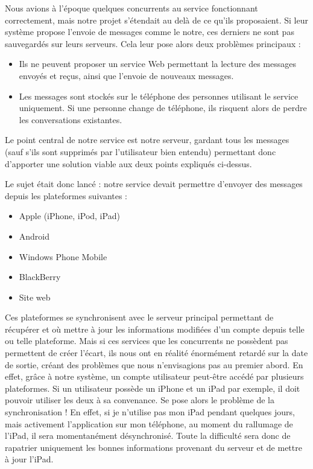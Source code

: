 \documentclass{article}
\begin{document}
	Nous avions à l’époque quelques concurrents au service fonctionnant correctement, mais notre projet s’étendait au delà de ce qu’ils proposaient. Si leur système propose l’envoie de messages comme le notre, ces derniers ne sont pas sauvegardés sur leurs serveurs. Cela leur pose alors deux problèmes principaux :
\begin{itemize}
\item Ils ne peuvent proposer un service Web permettant la lecture des messages envoyés et reçus, ainsi que l’envoie de nouveaux messages.
\item Les messages sont stockés sur le téléphone des personnes utilisant le service uniquement. Si une personne change de téléphone, ils risquent alors de perdre les conversations existantes.
\end{itemize}

Le point central de notre service est notre serveur, gardant tous les messages (sauf s’ils sont supprimés par l’utilisateur bien entendu) permettant donc d’apporter une solution viable aux deux points expliqués ci-dessus.
	
Le sujet était donc lancé : notre service devait permettre d’envoyer des messages depuis les plateformes suivantes :
\begin{itemize}
\item Apple (iPhone, iPod, iPad)
\item Android
\item Windows Phone Mobile
\item BlackBerry
\item Site web
\end{itemize}

Ces plateformes se synchronisent avec le serveur principal permettant de récupérer et où mettre à jour les informations modifiées d’un compte depuis telle ou telle plateforme. Mais si ces services que les concurrents ne possèdent pas permettent de créer l’écart, ils nous ont en réalité énormément retardé sur la date de sortie, créant des problèmes que nous n’envisagions pas au premier abord. En effet, grâce à notre système, un compte utilisateur peut-être accédé par plusieurs plateformes. Si un utilisateur possède un iPhone et un iPad par exemple, il doit pouvoir utiliser les deux à sa convenance.  Se pose alors le problème de la synchronisation ! En effet, si je n’utilise pas mon iPad pendant quelques jours, mais activement l’application sur mon téléphone,  au moment du rallumage de l’iPad, il sera momentanément désynchronisé. Toute la difficulté sera donc de rapatrier uniquement les bonnes informations provenant du serveur et de mettre à jour l’iPad.
\end{document}
